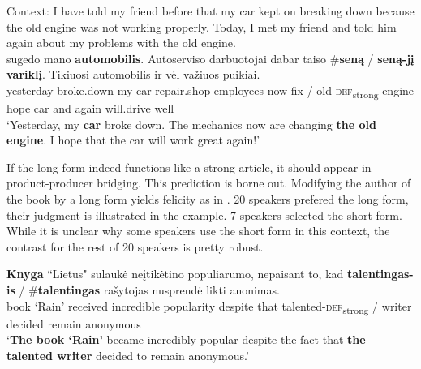 \documentclass[output=paper,
modfonts
]{langscibook}
\begin{document}
\begin{exe}
	\ex \label{ex:sereikaite:55}
	Context: I have told my friend before that my car kept on breaking down because the old engine was not working properly. Today, I met my friend and told him again about my problems with the old engine. \\ 
	 {sugedo} {mano} {\textbf{automobilis}}. {Autoserviso} {darbuotojai} {dabar} {taiso} \textnormal{\#}\textbf{seną} \textnormal{/} \textbf{seną-jį} {\textbf{variklį}}. {Tikiuosi} {automobilis} {ir} {vėl} {važiuos} {puikiai}.\\
	yesterday broke.down my {car} repair.shop employees now fix  / {old-\textsc{def}\textsubscript{strong}} engine hope car and again will.drive well \\ 
	\trans `Yesterday, my \textbf{car} broke down. The mechanics now are changing \textbf{the old engine}. I hope that the car will work great again!' 
\end{exe} 


If the long form indeed functions like a strong article, it should appear in product-producer bridging. This prediction is borne out. Modifying the author of the book by a long form yields felicity as in . 20 speakers prefered the long form, their judgment is illustrated in the example. 7 speakers selected the short form. While it is unclear why some speakers use the short form in this context, the contrast for the rest of 20 speakers is pretty robust. 

\begin{exe}
	\ex \label{ex:sereikaite:56}
	\gll \textbf{{Knyga}} ``{Lietus}" {sulaukė} {neįtikėtino} {populiarumo}, {nepaisant} {to}, {kad} \textbf{talentingas-is} \textnormal{/} \textnormal{\#}\textbf{talentingas} {rašytojas} {nusprendė} {likti} {anonimas}.\\
	{book} `Rain' received incredible popularity despite {} that {talented-\textsc{def}\textsubscript{strong}} /  writer decided remain anonymous\\
	\trans `\textbf{The book `Rain'} became incredibly popular despite the fact that \textbf{the talented writer} decided to remain anonymous.' 
\end{exe} 
\end{document}

